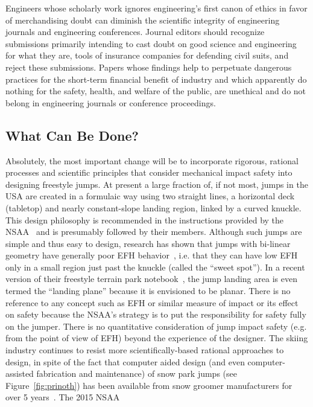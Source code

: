 \documentclass[fleqn,10pt,lineno]{wlpeerj}
\begin{document}
Engineers whose scholarly work ignores engineering's first canon of ethics in
favor of merchandising doubt can diminish the scientific integrity of
engineering journals and engineering conferences. Journal editors should
recognize submissions primarily intending to cast doubt on good science and
engineering for what they are, tools of insurance companies for defending civil
suits, and reject these submissions. Papers whose findings help to perpetuate
dangerous practices for the short-term financial benefit of industry and which
apparently do nothing for the safety, health, and welfare of the public, are
unethical and do not belong in engineering journals or conference proceedings.

\subsection*{What Can Be Done?}
\label{sec:action}
%
Absolutely, the most important change will be to incorporate rigorous, rational
processes and scientific principles that consider mechanical impact safety into
designing freestyle jumps.  At present a large fraction of, if not most, jumps
in the USA are created in a formulaic way using two straight lines, a
horizontal deck (tabletop) and nearly constant-slope landing region, linked by
a curved knuckle. This design philosophy is recommended in the instructions
provided by the NSAA~\citep{NSAA2015} and is presumably followed by their
members. Although such jumps are simple and thus easy to design, research has
shown that jumps with bi-linear geometry have generally poor EFH
behavior~\citep{Swedberg2012}, i.e. that they can have low EFH only in a small
region just past the knuckle (called the ``sweet spot''). In a recent version
of their freestyle terrain park notebook~\citep{NSAA2015}, the jump landing
area is even termed the ``landing plane'' because it is envisioned to be
planar.  There is no reference to any concept such as EFH or similar measure of
impact or its effect on safety because the NSAA's strategy is to put the
responsibility for safety fully on the jumper. There is no quantitative
consideration of jump impact safety (e.g. from the point of view of EFH) beyond
the experience of the designer. The skiing industry continues to resist more
scientifically-based rational approaches to design, in spite of the fact that
computer aided design (and even computer-assisted fabrication and maintenance)
of snow park jumps (see Figure~\ref{fig:prinoth}) has been available from snow
groomer manufacturers for over 5 years~\citep{Muigg2019}. The 2015 NSAA
\end{document}
